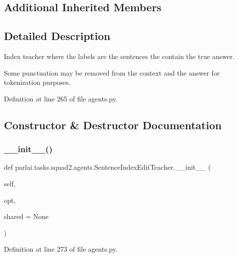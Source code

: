\subsection*{Additional Inherited Members}


\subsection{Detailed Description}
\begin{DoxyVerb}Index teacher where the labels are the sentences the contain the true
answer.

Some punctuation may be removed from the context and the answer for
tokenization purposes.
\end{DoxyVerb}
 

Definition at line 265 of file agents.\+py.



\subsection{Constructor \& Destructor Documentation}
\mbox{\label{classparlai_1_1tasks_1_1squad2_1_1agents_1_1SentenceIndexEditTeacher_a7edf449f03ad58cfa58b856b7ada36b5}} 
\subsubsection{\texorpdfstring{\+\_\+\+\_\+init\+\_\+\+\_\+()}{\_\_init\_\_()}}
{\footnotesize\ttfamily def parlai.\+tasks.\+squad2.\+agents.\+Sentence\+Index\+Edit\+Teacher.\+\_\+\+\_\+init\+\_\+\+\_\+ (\begin{DoxyParamCaption}\item[{}]{self,  }\item[{}]{opt,  }\item[{}]{shared = {\ttfamily None} }\end{DoxyParamCaption})}



Definition at line 273 of file agents.\+py.



